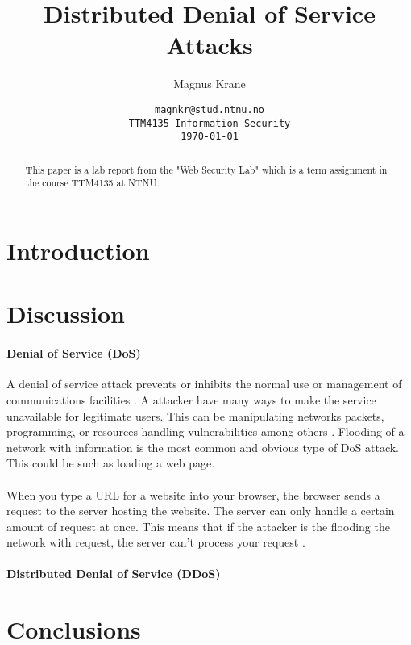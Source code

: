 \documentclass[a4paper,11pt]{article}
\title{Distributed Denial of Service Attacks}
\author{Magnus Krane}
\date{\tt {magnkr@stud.ntnu.no}\\
TTM4135 Information Security\\
\today}
\begin{document}
\maketitle
\vspace{3cm}
\begin{abstract}
This paper is a lab report from the "Web Security Lab" which is a term assignment in the course TTM4135 at NTNU. 
\end{abstract}
\section{Introduction}
\paragraph{}
\section{Discussion}
\paragraph{Denial of Service (DoS)\newline} A denial of service attack prevents or inhibits the normal use or management of communications facilities \cite{1}. A attacker have many ways to make the service unavailable for legitimate users. This can be manipulating networks packets, programming, or resources handling vulnerabilities among others \cite{3}. Flooding of a network with information is the most common and obvious type of DoS attack. This could be such as loading a web page.
\paragraph{}When you type a URL for a website into your browser, the browser sends a request to the server hosting the website. The server can only handle a certain amount of request at once. This means that if the attacker is the flooding the network with request, the server can't process your request \cite{4}. 
\paragraph{Distributed Denial of Service (DDoS)}
\section{Conclusions}
\end{document}
